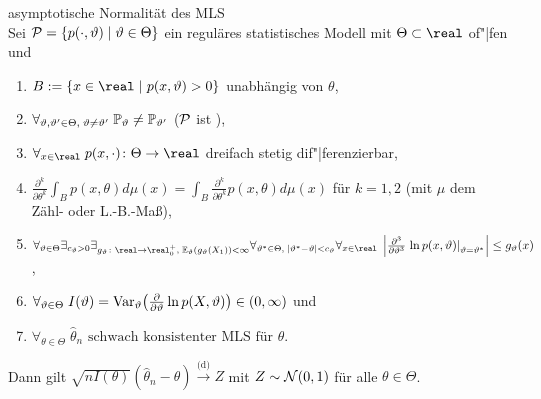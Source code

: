 \begin{Satz}{asymptotische Normalität des MLS}\\
    Sei $\P = \{p(\cdot, \theta) \;|\; \theta \in \Theta\}$
    ein reguläres statistisches Modell mit $\Theta \subset \real$ of"|fen und
    \begin{enumerate}
        \item
        $B := \{x \in \real \;|\ p(x, \theta) > 0\}$ unabhängig von $\theta$,

        \item
        $\forall_{\theta, \theta' \in \Theta,\; \theta \not= \theta'}\;
        \PP_\theta \not= \PP_{\theta'}$
        ($\P$ ist ),

        \item
        $\forall_{x \in \real}\; p(x, \cdot)\colon \Theta \rightarrow \real$ dreifach stetig
        dif"|ferenzierbar,

        \item
        $\frac{\partial^k}{\partial \theta^k} \int_B p(x, \theta) d\mu(x) =
        \int_B \frac{\partial^k}{\partial \theta^k} p(x, \theta) d\mu(x)$ für $k = 1, 2$
        (mit $\mu$ dem Zähl- oder L.-B.-Maß),

        \item
        $\forall_{\theta \in \Theta} \exists_{c_\theta > 0}
        \exists_{g_\theta\colon \real \rightarrow \real_0^+,\; \EE_\theta(g_\theta(X_1)) < \infty}
        \forall_{\theta^\ast \in \Theta,\; |\theta^\ast - \theta| < c_\theta}
        \forall_{x \in \real}\;
        \left|\frac{\partial^3}{\partial \theta^3}
        \left.\ln p(x, \theta)\right|_{\theta = \theta^\ast}\right| \le g_\theta(x)$,

        \item
        $\forall_{\theta \in \Theta}\; I(\theta) =
        \Var_\theta\!\left(\frac{\partial}{\partial \theta} \ln p(X, \theta)\right) \in
        (0, \infty)$ und

        \item
        $\forall_{\theta \in \Theta}\; \widehat{\theta}_n \text{ schwach konsistenter MLS für }
        \theta$.
    \end{enumerate}
    Dann gilt $\sqrt{n I(\theta)} (\widehat{\theta}_n - \theta)
    \xrightarrow{\text{(d)}} Z$ mit $Z \sim \N(0, 1)$ für alle $\theta \in \Theta$.
\end{Satz}

\pagebreak
